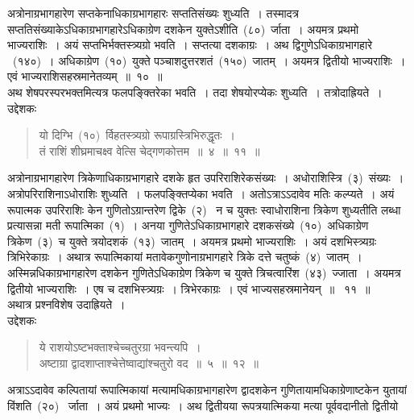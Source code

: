 \documentclass[11pt, openany]{book}
\begin{document}
\newpage
\thispagestyle{fancy}
\fancyhf{}
\indent
अत्रोनाग्रभागहारेण सप्तकेनाधिकाग्रभागहारः सप्ततिसंख्यः शुध्यति~। तस्मादत्र सप्ततिसंख्याकेऽधिकाग्रभागहारेऽधिकाग्रेण दशकेन युक्तेऽशीति~(८०)~र्जाता~। अयमत्र प्रथमो भाज्यराशिः~। अयं सप्तभिर्भक्तस्त्र्यग्रो भवति~। सप्तत्या दशकाग्रः~। अथ द्विगुणेऽधिकाग्रभागहारे ~(१४०)~। अधिकाग्रेण~(१०)~युक्ते पञ्चाशदुत्तरशतं~(१५०)~जातम्~। अयमत्र द्वितीयो भाज्यराशिः~। एवं भाज्यराशिसहस्रमानेतव्यम्~॥~१०~॥\\
\indent
अथ शेषपरस्परभक्तमित्यत्र फलपङ्क्तिरेका भवति~। तदा शेषयोरप्येकः
शुध्यति~। तत्रोदाह्रियते~।\\
उद्देशकः\textendash
\begin{quote}
{\ku
यो दिग्भि~(१०)~र्विहतस्त्र्यग्रो रूपाग्रस्त्रिभिरुद्धृतः~।\\
तं राशिं शीघ्रमाचक्ष्व वेत्सि चेद्गणकोत्तम~॥~४~॥~११~॥}
\end{quote}

\indent
अत्रोनाग्रभागहारेण त्रिकेणाधिकाग्रभागहारे दशके हृत उपरिराशिरेकसंख्यः~। अधोराशिस्त्रि~(३)~संख्यः~। अत्रोपरिराशिनाऽधोराशिः शुध्यति~। फलपङ्क्तिप्येका भवति~। अतोऽत्राऽऽदावेव मतिः कल्प्यते~। अयं रूपात्मक उपरिराशिः केन गुणितोऽग्रान्तरेण द्विके~(२)~ न च युक्तः स्वाधोराशिना त्रिकेण शुध्यतीति लब्धा प्रत्यासन्ना मती रूपात्मिका~(१)~। अनया गुणितेऽधिकाग्रभागहारे दशकसंख्ये~(१०)~अधिकाग्रेण त्रिकेण~(३)~च युक्ते त्रयोदशकं~(१३)~जातम्~। अयमत्र प्रथमो भाज्यराशिः~। अयं दशभिस्त्र्यग्रः त्रिभिरेकाग्रः~। अथात्र रूपात्मिकायां मतावेकगुणोनाग्रभागहारे त्रिके दत्ते चतुष्कं~(४)~जातम्~। अस्मिन्नधिकाग्रभागहारेण दशकेन गुणितेऽधिकाग्रेण त्रिकेण च युक्ते त्रिचत्वारिंश~(४३)~ज्जाता~। अयमत्र द्वितीयो भाज्यराशिः~। एष च दशभिस्त्र्यग्रः~। त्रिभेरकाग्रः~। एवं भाज्यसहस्रमानेयन्~॥~ ११~॥\\

\indent
अथात्र प्रश्नविशेष उदाह्रियते~।\\
उद्देशकः \textendash
\begin{quote}
{\ku
ये राशयोऽष्टभक्ताश्चेच्चतुरग्रा भवन्त्यपि~।\\
अष्टाग्रा द्वादशाप्ताश्चेत्तेष्वाद्यांश्चतुरो वद~॥~५~॥~१२~॥}
\end{quote}

\indent
अत्राऽऽदावेव कल्पितायां रूपात्मिकायां मत्यामधिकाग्रभागहारेण द्वादशकेन गुणितायामधिकाग्रेणाष्टकेन युतायां विंशति~(२०)~ र्जाता~। अयं प्रथमो भाज्यः~। अथ द्वितीयया रूपत्रयात्मिकया मत्या पूर्ववदानीतो द्वितीयो

\end{document}
